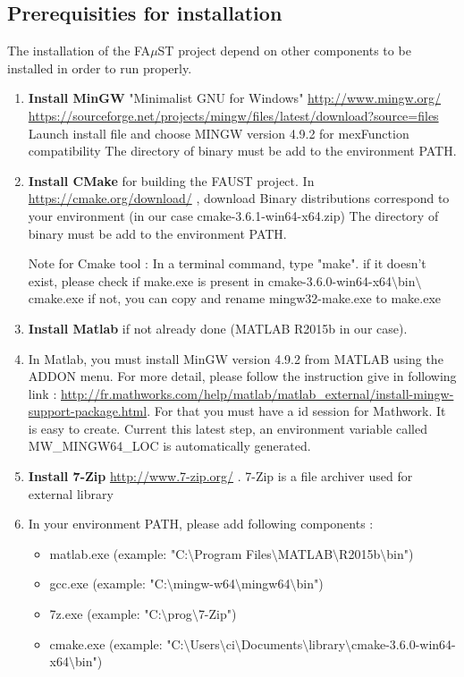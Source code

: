 \subsection{Prerequisities for installation}\label{sec:WinPrerequisitiesInstall}
The installation of the FA$\mu$ST project depend on other components to be installed in order to run properly. 
\begin{enumerate}
\item \textbf{Install MinGW} "Minimalist GNU for Windows" \url{http://www.mingw.org/}
\url{https://sourceforge.net/projects/mingw/files/latest/download?source=files}
Launch install file and choose MINGW version 4.9.2 for mexFunction compatibility 
The directory of binary must be add to the environment PATH. 

\item \textbf{Install CMake} for building the FAUST project. 
In \url{https://cmake.org/download/} , download Binary distributions correspond to your environment (in our case  cmake-3.6.1-win64-x64.zip)
The directory of binary must be add to the environment PATH. 

Note for Cmake tool : In a terminal command, type "make". if it doesn't exist, please check if make.exe is present in cmake-3.6.0-win64-x64$\setminus$bin$\setminus$cmake.exe
if not, you can copy and rename mingw32-make.exe to make.exe

\item \textbf{Install Matlab} if not already done (MATLAB R2015b in our case).

\item In Matlab, you must install MinGW version 4.9.2 from MATLAB using the ADDON menu. For more detail, please follow the instruction give in following link :  
\url{http://fr.mathworks.com/help/matlab/matlab_external/install-mingw-support-package.html}. For that you must have a id session for Mathwork. It is easy to create. 
Current this latest step, an environment variable called MW\_MINGW64\_LOC is automatically generated. 

\item \textbf{Install 7-Zip} \url{http://www.7-zip.org/} . 7-Zip is a file archiver used for external library

\item In your environment PATH, please add following components :

\begin{itemize}
\item matlab.exe (example: "C:$\setminus$Program Files$\setminus$MATLAB$\setminus$R2015b$\setminus$bin")
\item gcc.exe (example: "C:$\setminus$mingw-w64$\setminus$mingw64$\setminus$bin") 
\item 7z.exe (example: "C:$\setminus$prog$\setminus$7-Zip")
\item cmake.exe (example: "C:$\setminus$Users$\setminus$ci$\setminus$Documents$\setminus$library$\setminus$cmake-3.6.0-win64-x64$\setminus$bin")
\end{itemize}
\end{enumerate}


